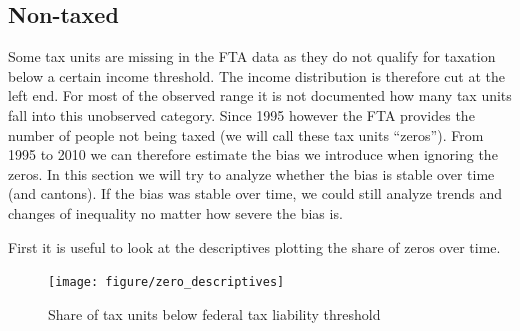 \documentclass[twoside]{article}\usepackage[]{graphicx}\usepackage[]{color}
\newenvironment{knitrout}{}{} %
\begin{document}
\begin{multicols}{2}


\subsection{Non-taxed}
Some tax units are missing in the FTA data as they do not qualify for taxation below a certain income threshold. The income distribution is therefore cut at the left end. For most of the observed range it is not documented how many tax units fall into this unobserved category. Since 1995 however the FTA provides the number of people not being taxed (we will call these tax units ``zeros''). From 1995 to 2010 we can therefore estimate the bias we introduce when ignoring the zeros. In this section we will try to analyze whether the bias is stable over time (and cantons). If the bias was stable over time, we could still analyze trends and changes of inequality no matter how severe the bias is. 

First it is useful to look at the descriptives plotting the share of zeros over time.



\begin{knitrout}
\color{fgcolor}\begin{figure}[H]

\texttt{[image: figure/zero\_descriptives]} \caption[Share of tax units below federal tax liability threshold]{Share of tax units below federal tax liability threshold\label{fig:zero_descriptives}}
\end{figure}



\end{knitrout}
\end{multicols}
\end{document}

